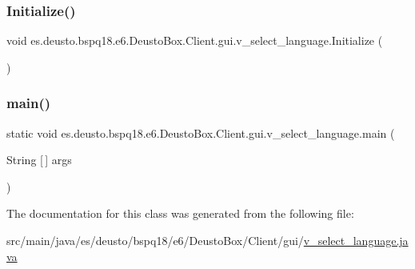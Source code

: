\subsubsection{\texorpdfstring{Initialize()}{Initialize()}}
{\footnotesize\ttfamily void es.\+deusto.\+bspq18.\+e6.\+Deusto\+Box.\+Client.\+gui.\+v\+\_\+select\+\_\+language.\+Initialize (\begin{DoxyParamCaption}{ }\end{DoxyParamCaption})}

\mbox{\label{classes_1_1deusto_1_1bspq18_1_1e6_1_1_deusto_box_1_1_client_1_1gui_1_1v__select__language_abff2080b5331d2fb16c01d89328f81dd}} 
\subsubsection{\texorpdfstring{main()}{main()}}
{\footnotesize\ttfamily static void es.\+deusto.\+bspq18.\+e6.\+Deusto\+Box.\+Client.\+gui.\+v\+\_\+select\+\_\+language.\+main (\begin{DoxyParamCaption}\item[{String \mbox{[}$\,$\mbox{]}}]{args }\end{DoxyParamCaption})\hspace{0.3cm}{\ttfamily [static]}}



The documentation for this class was generated from the following file\+:\begin{DoxyCompactItemize}
\item 
src/main/java/es/deusto/bspq18/e6/\+Deusto\+Box/\+Client/gui/\mbox{\hyperlink{v__select__language_8java}{v\+\_\+select\+\_\+language.\+java}}\end{DoxyCompactItemize}
